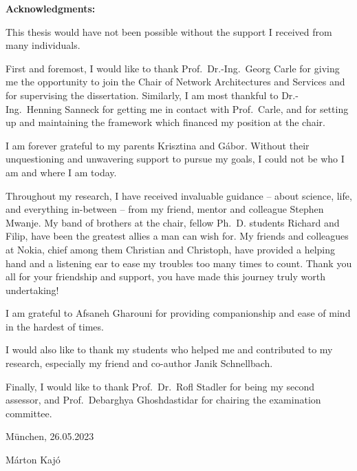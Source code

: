 \thispagestyle{empty}
\vspace*{12\baselineskip}

{\large\textbf{Acknowledgments:} }
\par

This thesis would have not been possible without the support I received from many individuals.

First and foremost, I would like to thank Prof.~Dr.-Ing.~Georg Carle for giving me the opportunity to join the Chair of Network Architectures and Services and for supervising the dissertation. Similarly, I am most thankful to Dr.-Ing.~Henning Sanneck for getting me in contact with Prof.~Carle, and for setting up and maintaining the framework which financed my position at the chair.

I am forever grateful to my parents Krisztina and G\'abor. Without their unquestioning and unwavering support to pursue my goals, I could not be who I am and where I am today.

Throughout my research, I have received invaluable guidance -- about science, life, and everything in-between -- from my friend, mentor and colleague Stephen Mwanje.
My band of brothers at the chair, fellow Ph.~D. students Richard and Filip, have been the greatest allies a man can wish for.
My friends and colleagues at Nokia, chief among them Christian and Christoph, have provided a helping hand and a listening ear to ease my troubles too many times to count.
Thank you all for your friendship and support, you have made this journey truly worth undertaking!

I am grateful to Afsaneh Gharouni for providing companionship and ease of mind in the hardest of times.

I would also like to thank my students who helped me and contributed to my research, especially my friend and co-author Janik Schnellbach.

Finally, I would like to thank Prof.~Dr.~Rofl Stadler for being my second assessor, and Prof.~Debarghya Ghoshdastidar for chairing the examination committee.

\vspace{20mm}

\hfill M\"unchen, 26.05.2023

\vspace{5mm}
\hfill M\'arton Kaj\'o


\clearpage






